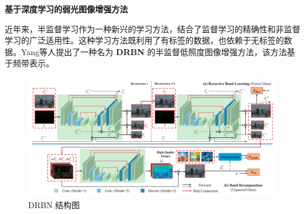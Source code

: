 \documentclass[CJK,aspectratio=169]{beamer}  %
\begin{document}
	\begin{frame}
		{ \yahei \textbf{基于深度学习的弱光图像增强方法}}
		
		{ \yahei 近年来，半监督学习作为一种新兴的学习方法，结合了监督学习的精确性和非监督学习的广泛适用性。这种学习方法既利用了有标签的数据，也依赖于无标签的数据。Yang等人\textcolor{blue}{\citep{qiao2021deep}}提出了一种名为 \textbf{DRBN} 的半监督低照度图像增强方法，该方法基于频带表示。}
		
		\begin{figure}
			\centering
			\setlength{\abovecaptionskip}{-0.05cm}
			\begin{minipage}{.7\columnwidth}
				\centering 
				\includegraphics[width=\columnwidth]{picture/LLIE/DRBN/DRBN}
				\caption{
					\tiny DRBN 结构图
				}
			\end{minipage}
		\end{figure}
		
	\end{frame}
	
\end{document}
